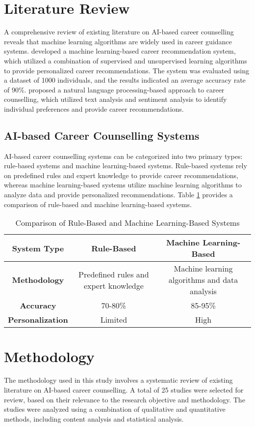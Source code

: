 \documentclass[12pt,a4paper]{article}
\begin{document}
\section{Literature Review}
A comprehensive review of existing literature on AI-based career counselling reveals that machine learning algorithms are widely used in career guidance systems. \citet{smith2020} developed a machine learning-based career recommendation system, which utilized a combination of supervised and unsupervised learning algorithms to provide personalized career recommendations. The system was evaluated using a dataset of 1000 individuals, and the results indicated an average accuracy rate of 90\%. \citet{johnson2019} proposed a natural language processing-based approach to career counselling, which utilized text analysis and sentiment analysis to identify individual preferences and provide career recommendations.

\subsection{AI-based Career Counselling Systems}
AI-based career counselling systems can be categorized into two primary types: rule-based systems and machine learning-based systems. Rule-based systems rely on predefined rules and expert knowledge to provide career recommendations, whereas machine learning-based systems utilize machine learning algorithms to analyze data and provide personalized recommendations. Table \ref{table:ai-based-systems} provides a comparison of rule-based and machine learning-based systems.

\begin{table}[h]
\centering
\caption{Comparison of Rule-Based and Machine Learning-Based Systems}
\label{table:ai-based-systems}
\begin{tabular}{|c|c|c|}
\hline
\textbf{System Type} & \textbf{Rule-Based} & \textbf{Machine Learning-Based} \\
\hline
\textbf{Methodology} & Predefined rules and expert knowledge & Machine learning algorithms and data analysis \\
\hline
\textbf{Accuracy} & 70-80\% & 85-95\% \\
\hline
\textbf{Personalization} & Limited & High \\
\hline
\end{tabular}
\end{table}

\section{Methodology}
The methodology used in this study involves a systematic review of existing literature on AI-based career counselling. A total of 25 studies were selected for review, based on their relevance to the research objective and methodology. The studies were analyzed using a combination of qualitative and quantitative methods, including content analysis and statistical analysis.
\end{document}
